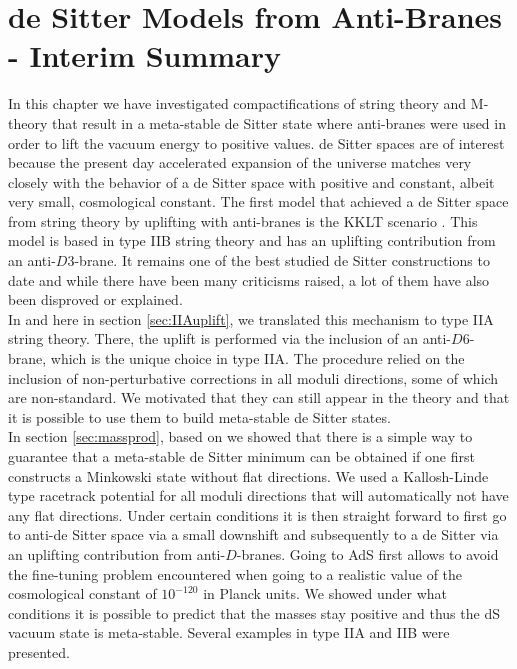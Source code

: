 \documentclass[12pt]{report}
\begin{document}
\section{de Sitter Models from Anti-Branes - Interim Summary}
In this chapter we have investigated compactifications of string theory and M-theory that result in a meta-stable de Sitter state where anti-branes were used in order to lift the vacuum energy to positive values. de Sitter spaces are of interest because the present day accelerated expansion of the universe matches very closely with the behavior  of a de Sitter space with positive and constant, albeit very small, cosmological constant. The first model that achieved a de Sitter space from string theory by uplifting with anti-branes is the KKLT scenario \cite{Kachru:2003aw,Kachru:2003sx}. This model is based in type IIB string theory and has an uplifting contribution from an anti-$D3$-brane. It remains one of the best studied de Sitter constructions to date and while there have been many criticisms raised, a lot of them have also been disproved or explained.\\
In \cite{Cribiori:2019bfx} and here in section \ref{sec:IIAuplift}, we translated this mechanism to type IIA string theory. There, the uplift is performed via the inclusion of an anti-$D6$-brane, which is the unique choice in type IIA. The procedure relied on the inclusion of non-perturbative corrections in all moduli directions, some of which are non-standard. We motivated that they can still appear in the theory and that it is possible to use them to build meta-stable de Sitter states.\\
In section \ref{sec:massprod}, based on \cite{Kallosh:2019zgd,Cribiori:2019drf} we showed that there is a simple way to guarantee that a meta-stable de Sitter minimum can be obtained if one first constructs a Minkowski state without flat directions. We used a Kallosh-Linde type racetrack potential for all moduli directions that will automatically not have any flat directions. Under certain conditions it is then straight forward to first go to anti-de Sitter space via a small downshift and subsequently to a de Sitter via an uplifting contribution from anti-$D$-branes. Going to AdS first allows to avoid the fine-tuning problem encountered when going to a realistic value of the cosmological constant of $10^{-120}$ in Planck units. We showed under what conditions it is possible to predict that the masses stay positive and thus the dS vacuum state is meta-stable. Several examples in type IIA and IIB were presented.\\
\end{document}
